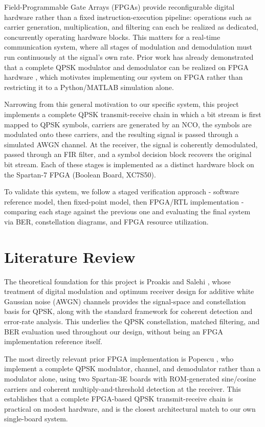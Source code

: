 \documentclass[10pt,twocolumn,letterpaper]{article}
\begin{document}
Field-Programmable Gate Arrays (FPGAs) provide reconfigurable digital
hardware rather than a fixed instruction-execution pipeline: operations
such as carrier generation, multiplication, and filtering can each be
realized as dedicated, concurrently operating hardware blocks. This matters for a real-time
communication system, where all stages of modulation and demodulation
must run continuously at the signal's own rate. Prior work has already demonstrated that
a complete QPSK modulator and demodulator can be realized on FPGA
hardware \cite{7777861,6034354}, which
motivates implementing our system on FPGA rather than restricting it
to a Python/MATLAB simulation alone.

Narrowing from this general motivation to our specific system, this
project implements a complete QPSK transmit-receive chain in which a
bit stream is first mapped to QPSK symbols, carriers are generated by
an NCO, the symbols are modulated onto these carriers, and the
resulting signal is passed through a simulated AWGN channel. At the
receiver, the signal is coherently demodulated, passed through an FIR
filter, and a symbol decision block recovers the original bit stream.
Each of these stages is implemented as a distinct hardware block on
the Spartan-7 FPGA (Boolean Board, XC7S50).

To validate this system, we follow a staged verification approach - software reference model, then fixed-point model, then FPGA/RTL implementation - comparing each stage against the previous one and evaluating the final system via BER, constellation diagrams, and FPGA resource utilization.

\section{Literature Review}
\label{sec:litreview}

The theoretical foundation for this project is Proakis and Salehi
\cite{proakis2002communication}, whose treatment of digital modulation and
optimum receiver design for additive white Gaussian noise (AWGN)
channels provides the signal-space and constellation basis for QPSK,
along with the standard framework for coherent detection and
error-rate analysis. This underlies the QPSK constellation, matched
filtering, and BER evaluation used throughout our design, without
being an FPGA implementation reference itself.

The most directly relevant prior FPGA implementation is Popescu \etal
\cite{6034354}, who implement a complete QPSK modulator,
channel, and demodulator rather than a modulator alone, using two
Spartan-3E boards with ROM-generated sine/cosine carriers and
coherent multiply-and-threshold detection at the receiver. This
establishes that a complete FPGA-based QPSK transmit-receive chain is
practical on modest hardware, and is the closest architectural match
to our own single-board system.
\end{document}
